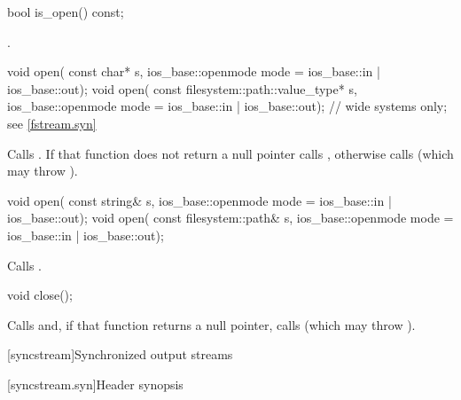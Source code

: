 %
\begin{itemdecl}
bool is_open() const;
\end{itemdecl}

\begin{itemdescr}
\pnum
\returns
{}.
\end{itemdescr}

%
\begin{itemdecl}
void open(
  const char* s,
  ios_base::openmode mode = ios_base::in | ios_base::out);
void open(
  const filesystem::path::value_type* s,
  ios_base::openmode mode = ios_base::in | ios_base::out);  // wide systems only; see \ref{fstream.syn}
\end{itemdecl}

\begin{itemdescr}
\pnum
\effects
Calls
.
If that function does not return a null pointer calls ,
otherwise calls
(which may throw
).
\end{itemdescr}

%
\begin{itemdecl}
void open(
  const string& s,
  ios_base::openmode mode = ios_base::in | ios_base::out);
void open(
  const filesystem::path& s,
  ios_base::openmode mode = ios_base::in | ios_base::out);
\end{itemdecl}

\begin{itemdescr}
\pnum
\effects
Calls .
\end{itemdescr}

%
\begin{itemdecl}
void close();
\end{itemdecl}

\begin{itemdescr}
\pnum
\effects
Calls
and, if that function
returns a null pointer,
calls
(which may throw
).
\end{itemdescr}

[syncstream]{Synchronized output streams}

[syncstream.syn]{Header  synopsis}

